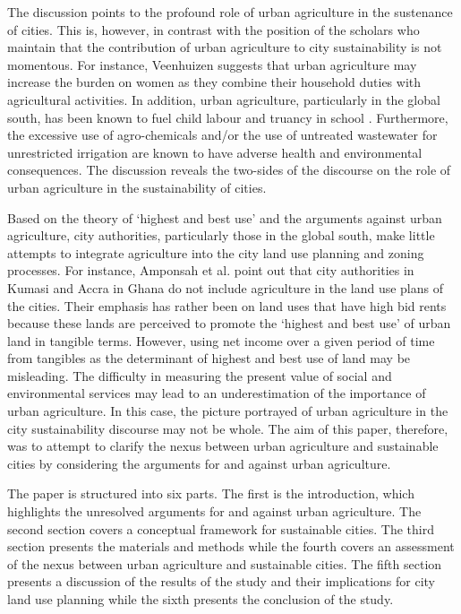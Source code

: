 The discussion points to the profound role of urban agriculture in the sustenance of cities. This is, however, in contrast with the position of the scholars who maintain that the contribution of urban agriculture to city sustainability is not momentous. For instance, Veenhuizen \cite{Veenhuizen} suggests that urban agriculture may increase the burden on women as they combine their household duties with agricultural activities. In addition, urban agriculture, particularly in the global south, has been known to fuel child labour and truancy in school \cite{Edet2013, InternationalLabourOrganization2006}. Furthermore, the excessive use of agro-chemicals \cite{Amoah2007, Agbenyour2014} and/or the use of untreated wastewater for unrestricted irrigation \cite{Amponsah2015, Amponsah2016, Becerra-Castro2015, Mara2010, Ndunda2013} are known to have adverse health and environmental consequences. The discussion reveals the two-sides of the discourse on the role of urban agriculture in the sustainability of cities.

Based on the theory of ‘highest and best use’ and the arguments against urban agriculture, city authorities, particularly those in the global south, make little attempts to integrate agriculture into the city land use planning and zoning processes. For instance, Amponsah et al. \cite{Amponsah2015, Amponsah2016} point out that city authorities in Kumasi and Accra in Ghana do not include agriculture in the land use plans of the cities. Their emphasis has rather been on land uses that have high bid rents because these lands are perceived to promote the ‘highest and best use’ of urban land in tangible terms. However, using net income over a given period of time from tangibles \cite{Fisher1954} as the determinant of highest and best use of land may be misleading. The difficulty in measuring the present value of social and environmental services may lead to an underestimation of the importance of urban agriculture. In this case, the picture portrayed of urban agriculture in the city sustainability discourse may not be whole. The aim of this paper, therefore, was to attempt to clarify the nexus between urban agriculture and sustainable cities by considering the arguments for and against urban agriculture.

The paper is structured into six parts. The first is the introduction, which highlights the unresolved arguments for and against urban agriculture. The second section covers a conceptual framework for sustainable cities. The third section presents the materials and methods while the fourth covers an assessment of the nexus between urban agriculture and sustainable cities. The fifth section presents a discussion of the results of the study and their implications for city land use planning while the sixth presents the conclusion of the study.


